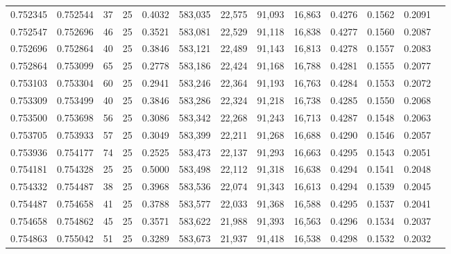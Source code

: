\begin{tabular}{rrrrrrrrrrrrr}
0.752345 & 0.752544 &    37 &  25 &                                     0.4032 & 583,035 &  22,575 &  91,093 &  16,863 & 0.4276 & 0.1562 & 0.2091 \\
0.752547 & 0.752696 &    46 &  25 &                                     0.3521 & 583,081 &  22,529 &  91,118 &  16,838 & 0.4277 & 0.1560 & 0.2087 \\
0.752696 & 0.752864 &    40 &  25 &                                     0.3846 & 583,121 &  22,489 &  91,143 &  16,813 & 0.4278 & 0.1557 & 0.2083 \\
0.752864 & 0.753099 &    65 &  25 &                                     0.2778 & 583,186 &  22,424 &  91,168 &  16,788 & 0.4281 & 0.1555 & 0.2077 \\
0.753103 & 0.753304 &    60 &  25 &                                     0.2941 & 583,246 &  22,364 &  91,193 &  16,763 & 0.4284 & 0.1553 & 0.2072 \\
0.753309 & 0.753499 &    40 &  25 &                                     0.3846 & 583,286 &  22,324 &  91,218 &  16,738 & 0.4285 & 0.1550 & 0.2068 \\
0.753500 & 0.753698 &    56 &  25 &                                     0.3086 & 583,342 &  22,268 &  91,243 &  16,713 & 0.4287 & 0.1548 & 0.2063 \\
0.753705 & 0.753933 &    57 &  25 &                                     0.3049 & 583,399 &  22,211 &  91,268 &  16,688 & 0.4290 & 0.1546 & 0.2057 \\
0.753936 & 0.754177 &    74 &  25 &                                     0.2525 & 583,473 &  22,137 &  91,293 &  16,663 & 0.4295 & 0.1543 & 0.2051 \\
0.754181 & 0.754328 &    25 &  25 &                                     0.5000 & 583,498 &  22,112 &  91,318 &  16,638 & 0.4294 & 0.1541 & 0.2048 \\
0.754332 & 0.754487 &    38 &  25 &                                     0.3968 & 583,536 &  22,074 &  91,343 &  16,613 & 0.4294 & 0.1539 & 0.2045 \\
0.754487 & 0.754658 &    41 &  25 &                                     0.3788 & 583,577 &  22,033 &  91,368 &  16,588 & 0.4295 & 0.1537 & 0.2041 \\
0.754658 & 0.754862 &    45 &  25 &                                     0.3571 & 583,622 &  21,988 &  91,393 &  16,563 & 0.4296 & 0.1534 & 0.2037 \\
0.754863 & 0.755042 &    51 &  25 &                                     0.3289 & 583,673 &  21,937 &  91,418 &  16,538 & 0.4298 & 0.1532 & 0.2032 \\

\end{tabular}
